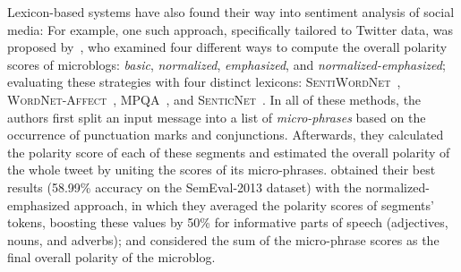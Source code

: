 
Lexicon-based systems have also found their way into sentiment
analysis of social media: For example, one such approach, specifically
tailored to Twitter data, was proposed by~\citet{Musto:14}, who
examined four different ways to compute the overall polarity scores of
microblogs: \emph{basic}, \emph{normalized}, \emph{emphasized}, and
\emph{normalized-emphasized}; evaluating these strategies with four
distinct lexicons: \textsc{Sen\-ti\-Word\-Net}~\cite{Esuli:06c},
\textsc{Word\-Net-\-Affect}~\cite{Strapparava:04},
\textsc{MPQA}~\cite{Wiebe:05}, and
\textsc{SenticNet}~\cite{Cambria:14}.  In all of these methods, the
authors first split an input message into a list of
\emph{micro-phrases} based on the occurrence of punctuation marks and
conjunctions.  Afterwards, they calculated the polarity score of each
of these segments and estimated the overall polarity of the whole
tweet by uniting the scores of its micro-phrases.
\citeauthor{Musto:14} obtained their best results (58.99\% accuracy on
the SemEval-2013 dataset) with the normalized-emphasized approach, in
which they averaged the polarity scores of segments' tokens, boosting
these values by 50\% for informative parts of speech (adjectives,
nouns, and adverbs); and considered the sum of the micro-phrase scores
as the final overall polarity of the microblog.


